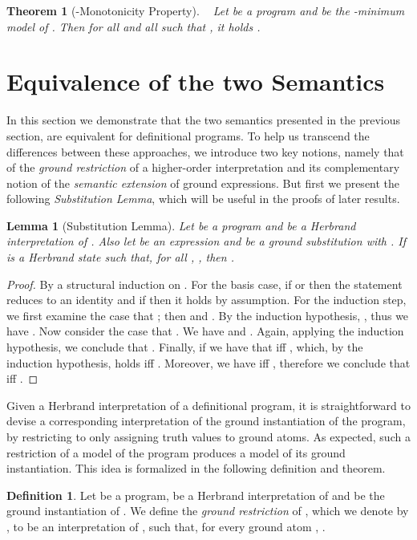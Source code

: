 \documentclass[submission,copyright]{eptcs}
\newtheorem{theorem}{Theorem}
\newtheorem{lemma}{Lemma}
\theoremstyle{definition}
\newtheorem{definition}{Definition}
\begin{document}
\begin{theorem}[-Monotonicity Property]\label{th-preceq-monotonicity}~\cite{Bezem2002}
Let  be a program and  be the -minimum model of . Then for all  and all  such that , it holds .
\end{theorem}

\section{Equivalence of the two Semantics}
\label{sec:positive}
\label{section4}
{In this section we demonstrate that the two semantics presented in the previous
section, are equivalent for definitional programs. To help us transcend the
differences between these approaches, we introduce two key notions, namely that
of the \emph{ground restriction} of a higher-order interpretation and its
complementary notion of the \emph{semantic extension} of ground expressions.
But first we present the following \emph{Substitution Lemma}, which will be useful in the proofs of later results.}
\begin{lemma}[Substitution Lemma]
\label{substitution_lemma}
Let  be a program and  be a Herbrand interpretation of . Also
let  be an expression and  be a ground
substitution with . If  is a Herbrand state such that, for all
, , then
.
\end{lemma}
\begin{proof}
By a structural induction on . For the basis case, if
 or  then
the statement reduces to an identity and if 
then it holds by assumption. For the induction step, we first examine the case that ;
then 
and .
By the induction hypothesis, , thus we have
.
Now consider the case that .
We have 
and .
Again, applying the induction hypothesis, we conclude that
.
Finally, if 
we have that  iff ,
which, by the induction hypothesis, holds iff
.
Moreover, we have  iff
,
therefore we conclude that  iff
.
\end{proof}

{Given a Herbrand interpretation  of a definitional program, it is straightforward to
devise a corresponding interpretation of the ground instantiation of the program,
by restricting  to only assigning truth values to ground atoms. As expected,
such a restriction of a model of the program produces a model of its ground
instantiation. This idea is formalized in the following definition and theorem.}
\begin{definition}
Let  be a program,  be a Herbrand interpretation of  and 
be the ground instantiation of . We define the \emph{ground restriction}
of , which we denote by , to be an interpretation of
, such that, for every ground atom
, .
\end{definition}
\end{document}
